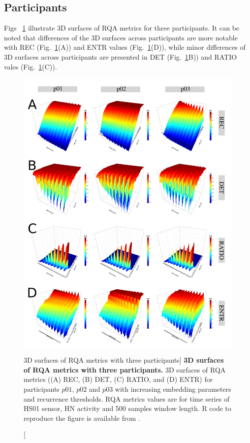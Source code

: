 \subsection{Participants}
Figs ~\ref{fig:topo_participants} illustrate 3D surfaces of RQA metrics for 
three participants.
It can be noted that differences of the 3D surfaces across participants 
are more notable with REC (Fig.~\ref{fig:topo_participants}(A)) and 
ENTR values (Fig.~\ref{fig:topo_participants}(D)),
while minor differences of 3D surfaces across participants are 
presented in
DET (Fig.~\ref{fig:topo_participants}B)) and 
RATIO vales (Fig.~\ref{fig:topo_participants}(C)).
\begin{figure}
\centering
\includegraphics[width=1.0\textwidth]{p}
    \caption
	[3D surfaces of RQA metrics with three participants]{
	{\bf 3D surfaces of RQA metrics with three participants.}
	3D surfaces of RQA metrics ((A) REC, (B) DET, (C) RATIO, and (D) ENTR) 
	for participants $p01$, $p02$ and $p03$ with increasing embedding 
	parameters and recurrence thresholds.
	RQA metrics values are for time series of HS01 sensor, 
	HN activity and 500 samples window length.
	R code to reproduce the figure is available from \cite{hwum2018}.
 }
\label{fig:topo_participants}
\end{figure}


